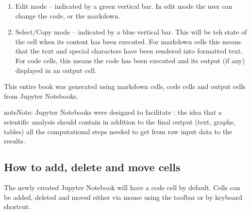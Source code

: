 \documentclass[letterpaper,10pt,english]{jupyterBook}
\begin{document}
\sphinxAtStartPar
{}
\begin{enumerate}
%
\item {} 
\sphinxAtStartPar
Edit mode – indicated by a green vertical bar. In edit mode the user can change the code, or the markdown.

\item {} 
\sphinxAtStartPar
Select/Copy mode – indicated by a blue vertical bar.  This will be teh state of the cell when its content has been executed.  For markdown cells this means that the text and special characters have been rendered into formatted text.  For code cells, this means the code has been executed and its output (if any) displayed in an output cell.

\end{enumerate}

\sphinxAtStartPar
{}

\sphinxAtStartPar
This entire book was generated using markdown cells, code cells and output cells from Jupyter Notebooks.

\begin{sphinxadmonition}{note}{Note:}
\sphinxAtStartPar
Jupyter Notebooks were designed to facilitate : the idea that a scientific analysis should contain \sphinxhyphen{} in addition to the final output (text, graphs, tables) \sphinxhyphen{} all the computational steps needed to get from raw input data to the results.
\end{sphinxadmonition}


\subsection{How to add, delete and move cells}
\label{\detokenize{content/04_PythonEssentials/Intro_Jupyter_notebook:how-to-add-delete-and-move-cells}}
\sphinxAtStartPar
The newly created Jupyter Notebook will have a code cell by default.  Cells can be added, deleted and moved either via mouse using the toolbar or by keyboard shortcut.
\end{document}
